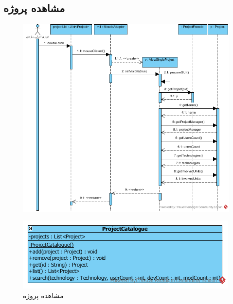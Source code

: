 \begin{landscape}
\section{مشاهده پروژه}
\begin{figure}[H]
	\centering
	\includegraphics[scale=0.7]{img/sequence-design/ViewProject}
\end{figure}
\begin{figure}[H]
	\centering
	\includegraphics[scale=0.8]{img/sequence-design/ViewProjectC}
	\caption{مشاهده پروژه}
\end{figure}

\newpage

\end{landscape}
